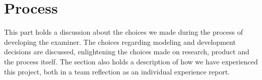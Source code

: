 



\section{Process}





This part holds a discussion about the choices we made
during the process of developing the \gls{examiner}. The choices regarding 
modeling and development decisions are discussed, enlightening the choices made
on research, product and the process itself. The section also holds a description of how we have experienced this project, both in a team reflection
as an individual experience report.



